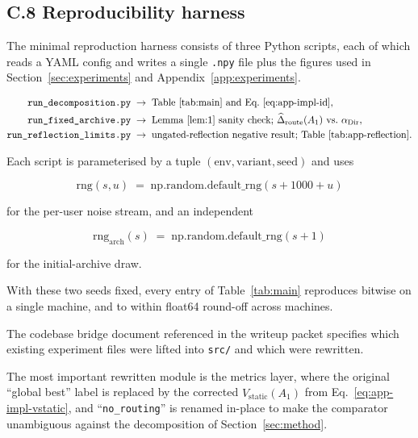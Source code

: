 \documentclass{article} %
\begin{document}
\subsection{C.8 Reproducibility harness}

\label{app:impl-repro}

The minimal reproduction harness consists of three Python scripts, each of which reads a YAML config and writes a single \texttt{.npy} file plus the figures used in Section~\ref{sec:experiments} and Appendix~\ref{app:experiments}.

\begin{align}
\label{eq:app-impl-h1}
\texttt{run\_decomposition.py} &\;\rightarrow\; \text{Table~\ref{tab:main} and Eq.~\eqref{eq:app-impl-id}},\\
\label{eq:app-impl-h2}
\texttt{run\_fixed\_archive.py} &\;\rightarrow\; \text{Lemma~\ref{lem:1} sanity check; }\widehat\Delta_{\mathrm{route}}(A_1)\text{ vs.\ }\alpha_{\mathrm{Dir}},\\
\label{eq:app-impl-h3}
\texttt{run\_reflection\_limits.py} &\;\rightarrow\; \text{ungated-reflection negative result; Table~\ref{tab:app-reflection}}.
\end{align}

Each script is parameterised by a tuple $(\text{env}, \text{variant}, \text{seed})$ and uses

\begin{equation}
\label{eq:app-impl-rngseed}
\text{rng}(s, u) \;=\; \mathrm{np.random.default\_rng}(s + 1000 + u)
\end{equation}

for the per-user noise stream, and an independent

\begin{equation}
\label{eq:app-impl-rngarch}
\text{rng}_{\text{arch}}(s) \;=\; \mathrm{np.random.default\_rng}(s + 1)
\end{equation}

for the initial-archive draw.

With these two seeds fixed, every entry of Table~\ref{tab:main} reproduces bitwise on a single machine, and to within float64 round-off across machines.

The codebase bridge document referenced in the writeup packet specifies which existing experiment files were lifted into \texttt{src/} and which were rewritten.

The most important rewritten module is the metrics layer, where the original ``global best'' label is replaced by the corrected $\widehat V_{\mathrm{static}}(A_1)$ from Eq.~\eqref{eq:app-impl-vstatic}, and ``\texttt{no\_routing}'' is renamed in-place to make the comparator unambiguous against the decomposition of Section~\ref{sec:method}.
\end{document}

